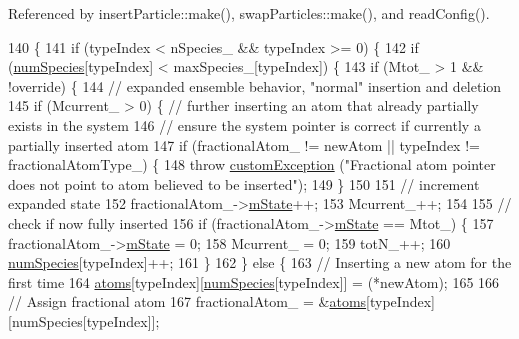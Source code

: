Referenced by insert\-Particle\-::make(), swap\-Particles\-::make(), and read\-Config().


\begin{DoxyCode}
140                                                                              \{
141     \textcolor{keywordflow}{if} (typeIndex < nSpecies\_ && typeIndex >= 0) \{
142         \textcolor{keywordflow}{if} (\hyperlink{classsim_system_a9eea865e6dc1cff377b1e79c4d9c23f0}{numSpecies}[typeIndex] < maxSpecies\_[typeIndex]) \{
143             \textcolor{keywordflow}{if} (Mtot\_ > 1 && !\textcolor{keyword}{override}) \{
144                 \textcolor{comment}{// expanded ensemble behavior, "normal" insertion and deletion}
145                 \textcolor{keywordflow}{if} (Mcurrent\_ > 0) \{ \textcolor{comment}{// further inserting an atom that already partially exists in the
       system}
146                     \textcolor{comment}{// ensure the system pointer is correct if currently a partially inserted atom}
147                     \textcolor{keywordflow}{if} (fractionalAtom\_ != newAtom || typeIndex != fractionalAtomType\_) \{
148                         \textcolor{keywordflow}{throw} \hyperlink{classcustom_exception}{customException} (\textcolor{stringliteral}{"Fractional atom pointer does not point to
       atom believed to be inserted"});
149                     \}
150 
151                     \textcolor{comment}{// increment expanded state}
152                     fractionalAtom\_->\hyperlink{classatom_a3cb00c0c5b7533657e05af6ff4a42740}{mState}++;
153                     Mcurrent\_++;
154 
155                     \textcolor{comment}{// check if now fully inserted}
156                     \textcolor{keywordflow}{if} (fractionalAtom\_->\hyperlink{classatom_a3cb00c0c5b7533657e05af6ff4a42740}{mState} == Mtot\_) \{
157                         fractionalAtom\_->\hyperlink{classatom_a3cb00c0c5b7533657e05af6ff4a42740}{mState} = 0;
158                         Mcurrent\_ = 0;
159                         totN\_++;
160                         \hyperlink{classsim_system_a9eea865e6dc1cff377b1e79c4d9c23f0}{numSpecies}[typeIndex]++;
161                     \}
162                 \} \textcolor{keywordflow}{else} \{
163                     \textcolor{comment}{// Inserting a new atom for the first time}
164                     \hyperlink{classsim_system_a90421b19082f7fb8fc23b7264b1161e4}{atoms}[typeIndex][\hyperlink{classsim_system_a9eea865e6dc1cff377b1e79c4d9c23f0}{numSpecies}[typeIndex]] = (*newAtom);
165 
166                     \textcolor{comment}{// Assign fractional atom}
167                     fractionalAtom\_ = &\hyperlink{classsim_system_a90421b19082f7fb8fc23b7264b1161e4}{atoms}[typeIndex][numSpecies[typeIndex]];

\end{DoxyCode}
